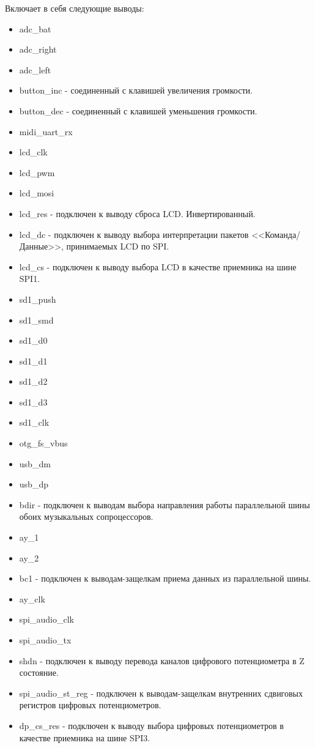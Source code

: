 \documentclass[a4paper, 12pt]{article}
\begin{document}
Включает в себя следующие выводы:
\begin{itemize}
	\item adc\_bat
	\item adc\_right
	\item adc\_left
	\item button\_inc - соединенный с клавишей увеличения громкости.
	\item button\_dec - соединенный с клавишей уменьшения громкости.
	\item midi\_uart\_rx
	\item lcd\_clk
	\item lcd\_pwm
	\item lcd\_mosi
	\item lcd\_res - подключен к выводу сброса LCD. Инвертированный.
	\item lcd\_dc - подключен к выводу выбора интерпретации пакетов <<Команда/Данные>>, принимаемых LCD по SPI.
	\item lcd\_cs - подключен к выводу выбора LCD в качестве приемника на шине SPI1.
	\item sd1\_push
	\item sd1\_smd
	\item sd1\_d0
	\item sd1\_d1
	\item sd1\_d2
	\item sd1\_d3
	\item sd1\_clk
	\item otg\_fs\_vbus
	\item usb\_dm
	\item usb\_dp
	\item bdir - подключен к выводам выбора направления работы параллельной шины обоих музыкальных сопроцессоров.
	\item ay\_1
	\item ay\_2
	\item bc1 - подключен к выводам-защелкам приема данных из параллельной шины.
	\item ay\_clk
	\item spi\_audio\_clk
	\item spi\_audio\_tx
	\item shdn - подключен к выводу перевода каналов цифрового потенциометра в Z состояние.
	\item spi\_audio\_st\_reg - подключен к выводам-защелкам внутренних сдвиговых регистров цифровых потенциометров.
	\item dp\_cs\_res - подключен к выводу выбора цифровых потенциометров в качестве приемника на шине SPI3.

\end{itemize}
\end{document}
